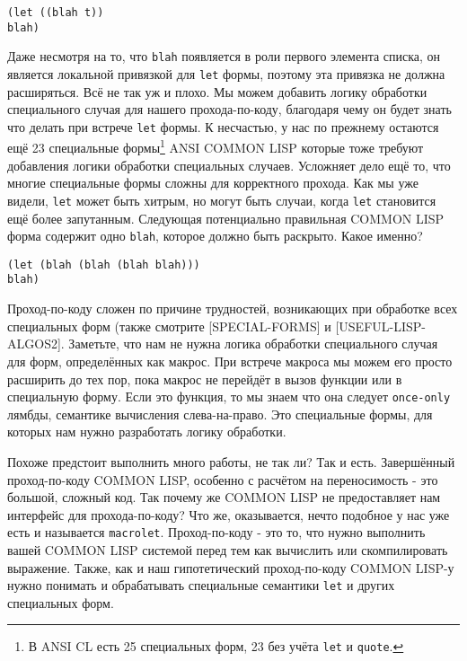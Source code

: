 \begin{verbatim}
(let ((blah t))
blah)
\end{verbatim}

Даже несмотря на то, что \verb"blah" появляется в роли первого элемента списка, он является локальной привязкой для \verb"let" формы, поэтому эта привязка не должна расширяться. Всё не так уж и плохо. Мы можем добавить логику обработки специального случая для нашего прохода-по-коду, благодаря чему он будет знать что делать при встрече \verb"let" формы. К несчастью, у нас по прежнему остаются ещё 23 специальные формы\footnote{В ANSI CL есть 25 специальных форм, 23 без учёта \verb"let" и \verb"quote".} ANSI COMMON LISP которые тоже требуют добавления логики обработки специальных случаев. Усложняет дело ещё то, что многие специальные формы сложны для корректного прохода. Как мы уже видели, \verb"let" может быть хитрым, но могут быть случаи, когда \verb"let" становится ещё более запутанным. Следующая потенциально правильная COMMON LISP форма содержит одно \verb"blah", которое должно быть раскрыто. Какое именно?



\begin{verbatim}
(let (blah (blah (blah blah)))
blah)
\end{verbatim}

Проход-по-коду сложен по причине трудностей, возникающих при обработке всех специальных форм (также смотрите [SPECIAL-FORMS] и [USEFUL-LISP-ALGOS2]. Заметьте, что нам не нужна логика обработки специального случая для форм, определённых как макрос. При встрече макроса мы можем его просто расширить до тех пор, пока макрос не перейдёт в вызов функции или в специальную форму. Если это функция, то мы знаем что она следует \verb"once-only" лямбды, семантике вычисления слева-на-право. Это специальные формы, для которых нам нужно разработать логику обработки.

Похоже предстоит выполнить много работы, не так ли? Так и есть. Завершённый проход-по-коду COMMON LISP, особенно с расчётом на переносимость - это большой, сложный код. Так почему же COMMON LISP не предоставляет нам интерфейс для прохода-по-коду? Что же, оказывается, нечто подобное у нас уже есть и называется \verb"macrolet". Проход-по-коду - это то, что нужно выполнить вашей COMMON LISP системой перед тем как вычислить или скомпилировать выражение. Также, как и наш гипотетический проход-по-коду COMMON LISP-у нужно понимать и обрабатывать специальные семантики \verb"let" и других специальных форм.


